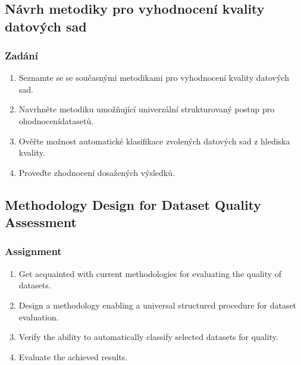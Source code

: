 \chapter*{}

\section*{Návrh metodiky pro vyhodnocení kvality datových sad}

\subsection*{Zadání}

\begin{enumerate}
    \item Seznamte se se současnými metodikami pro vyhodnocení kvality datových sad.
    \item Navrhněte metodiku umožňující univerzální strukturovaný postup pro ohodnocení\linebreak datasetů.
    \item Ověřte možnost automatické klasifikace zvolených datových sad z hlediska kvality.
    \item Proveďte zhodnocení dosažených výsledků.
\end{enumerate}

\vspace{3.5cm}

\section*{Methodology Design for Dataset Quality Assessment}

\subsection*{Assignment}

\begin{enumerate}
    \item Get acquainted with current methodologies for evaluating the quality of datasets.
    \item Design a methodology enabling a universal structured procedure for dataset evaluation.
    \item Verify the ability to automatically classify selected datasets for quality.
    \item Evaluate the achieved results.
\end{enumerate}
